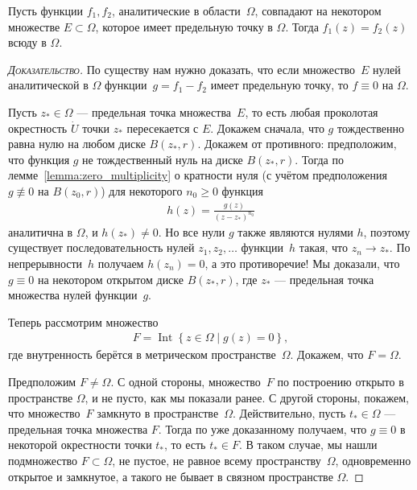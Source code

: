 \documentclass[../complex-analysis.tex]{subfiles}
\begin{document}
\begin{thm}
 \label{theorem:uniqueness}
 Пусть функции $ f_1,f_2 $, аналитические в области~$ \Omega $, совпадают на некотором множестве $ E \subset \Omega $, которое имеет предельную точку в $ \Omega $. Тогда $ f_1(z) = f_2(z) $ всюду в $ \Omega $.
\end{thm}
\begin{proof}[\normalfont\textsc{Доказательство}]
 По существу нам нужно доказать, что если множество~$ E $ нулей аналитической в $ \Omega $ функции~$ g = f_1 - f_2 $ имеет предельную точку, то $ f \equiv 0 $ на $ \Omega $.

 Пусть $ z_\ast \in \Omega $ --- предельная точка множества~$ E $, то есть любая проколотая окрестность $ \dot U $ точки $ z_\ast $ пересекается с $ E $. Докажем сначала, что $ g $ тождественно равна нулю на любом диске $ B(z_\ast,r) $. Докажем от противного: предположим, что функция $ g $ не тождественный нуль на диске $ B(z_\ast, r) $. Тогда по лемме~\ref{lemma:zero_multiplicity} о кратности нуля (с учётом предположения $ g \not\equiv 0 $ на $ B(z_0,r) $) для некоторого $ n_0 \geqslant 0 $ функция
 \begin{align*}
  h(z) = \frac{g(z)}{(z-z_\ast)^{n_0}}
 \end{align*} аналитична в $ \Omega $, и $ h(z_\ast) \neq 0 $. Но все нули $ g $ также являются нулями $ h $, поэтому существует последовательность нулей $ z_1, z_2, \ldots $ функции~$ h $ такая, что $ z_n \to z_\ast $. По непрерывности~$ h $ получаем $ h(z_n) = 0 $, а это противоречие! Мы доказали, что $ g \equiv 0 $ на некотором открытом диске $ B(z_\ast, r) $, где $ z_\ast $ --- предельная точка множества нулей функции~$ g $.

 Теперь рассмотрим множество
 \begin{align*}
  F = \mathop{\mathrm{Int}} \left\{ z \in \Omega \mid g(z) = 0 \right\},
 \end{align*} где внутренность берётся в метрическом пространстве~$ \Omega $. Докажем, что $ F = \Omega $.

 Предположим $ F \neq \Omega $. С одной стороны, множество~$ F $ по построению открыто в пространстве $ \Omega $, и не пусто, как мы показали ранее. С другой стороны, покажем, что множество~$ F $ замкнуто в пространстве~$ \Omega $. Действительно, пусть $ t_\ast \in \Omega $ --- предельная точка множества $ F $. Тогда по уже доказанному получаем, что $ g \equiv 0 $ в некоторой окрестности точки $ t_\ast $, то есть $ t_\ast \in F $. В таком случае, мы нашли подмножество $ F \subset \Omega $, не пустое, не равное всему пространству~$ \Omega $, одновременно открытое и замкнутое, а такого не бывает в связном пространстве $ \Omega $.
\end{proof}
\end{document}
